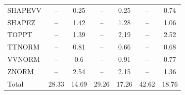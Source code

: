 \begin{table}[H]
\begin{center}
\begin{footnotesize}
\begin{tabular}{lcccccc}
				SHAPEVV & -- &  0.25 & -- &  0.25 & -- &  0.74 \\
				SHAPEZ & -- &  1.42 & -- &  1.28 & -- &  1.06 \\
				TOPPT & -- &  1.39 & -- &  2.19 & -- &  2.52 \\
				TTNORM & -- &  0.81 & -- &  0.66 & -- &  0.68 \\
				VVNORM & -- &  0.6 & -- &  0.91 & -- &  0.77 \\
				ZNORM & -- &  2.54 & -- &  2.15 & -- &  1.36 \\
				Total &  28.33  &  14.69 &  29.26  &  17.26 &  42.62  &  18.76 \\ \hline \hline
			\end{tabular}
			\label{tab:SysUncertainties_1700}
        \end{footnotesize}
	\end{center}
\end{table}


